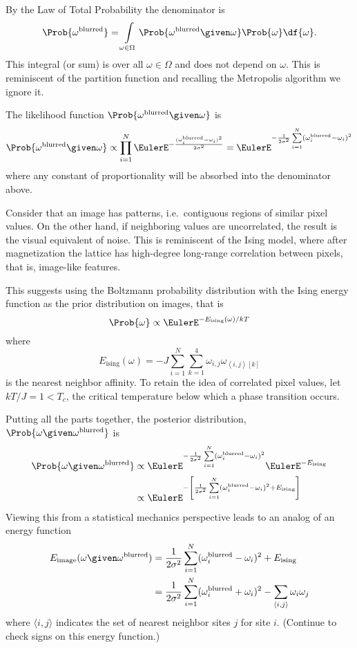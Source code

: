 \documentclass[12pt]{article}
\begin{document}
By the Law of Total Probability the denominator is
\[
    \Prob{ \omega^{\text{blurred}}} = \int\limits_{\omega
    \in \Omega} \Prob{\omega^{\text{blurred}} \given \omega} \Prob{\omega}
    \df{\omega}.
\] This integral (or sum) is over all \( \omega \in \Omega \) and does
not depend on \( \omega \).  This is reminiscent of the partition
function and recalling the Metropolis algorithm we ignore it.

The likelihood function \( \Prob{\omega^{\text{blurred}} \given \omega} \)
is%
\[
    \Prob{\omega^{\text{blurred}} \given \omega} \propto \prod_{i=1}^N
    \EulerE^{-\frac{ (\omega_i^{\text{blurred}} - \omega_i)^2}{2 \sigma^2}}
    = \EulerE^{ -\frac{1}{2\sigma^2} \sum\limits_{i=1}^N (\omega_i^{\text
    {blurred}} - \omega_i)^2}
\] where any constant of proportionality will be absorbed into the
denominator above.

Consider that an image has patterns, i.e.\ contiguous regions of similar
pixel values.  On the other hand, if neighboring values are
uncorrelated, the result is the visual equivalent of noise.  This is
reminiscent of the Ising model, where after magnetization the lattice
has high-degree long-range correlation between pixels, that is,
image-like features.

This suggests using the Boltzmann probability distribution with the
Ising energy function as the prior distribution on images, that is
\[
    \Prob{\omega} \propto \EulerE^{-E_{\text{ising}}(\omega)/kT}
  \] where
\[
    E_{\text{ising}}(\omega) = -J \sum\limits_{i=1}^{N} \sum\limits_{k=1}^4 \omega_{i,
    j} \omega_{\left\langle i,j \right\rangle[k]} 
\] is the nearest neighbor affinity.
To retain the idea of correlated pixel values, let \( kT/J = 1 < T_c \),
the critical temperature below which a phase transition occurs.

Putting all the parts together, the posterior distribution, \( \Prob{\omega
\given \omega^{\text{blurred}}} \) is
\begin{align*}
    \Prob{\omega \given \omega^{\text{blurred}}} &\propto \EulerE^{-\frac
    {1}{2\sigma^2 } \sum\limits_{i=1}^N(\omega_i^{\text{blurred}} -
    \omega_i)^{2}} \EulerE^{-E_{\text{ising}}} \\
    &\propto \EulerE^{-\left[ \frac{1}{2\sigma^2 } \sum\limits_{i=1}^N(\omega_i^
    {\text{blurred}} - \omega_i)^{2} + E_{\text{ising}}  \right] }
\end{align*}
Viewing this from a
statistical mechanics perspective leads to an analog of an energy
function
\begin{align*}
    E_{\text{image}}(\omega \given \omega^{\text{blurred}}) &= \frac{1}{2\sigma^2
      } \sum\limits_{i=1}^N(\omega_i^{\text{blurred}} - \omega_i)^{2} +
      E_{\text{ising}} \\
    &= \frac{1}{2\sigma^2 } \sum\limits_{i=1}^N(\omega_i^{\text{blurred}}
    + \omega_i)^{2} - \sum\limits_{\langle i,j\rangle} \omega_i\omega_j
    \\
\end{align*}
where \( {\langle i,j\rangle} \) indicates the set of nearest neighbor
sites \( j \) for site \( i \).  (Continue to check signs on this
energy function.)
\end{document}
